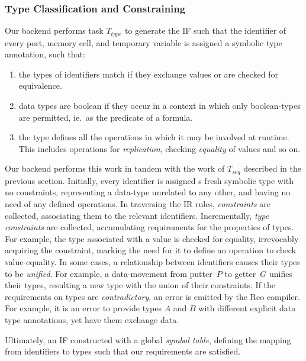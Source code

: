 \subsubsection{Type Classification and Constraining}
Our backend performs task $T_{type}$ to generate the IF such that the identifier of every port, memory cell, and temporary variable is assigned a symbolic type annotation, such that:
\begin{enumerate}
	\item the types of identifiers match if they exchange values or are checked for equivalence.
	\item data types are boolean if they occur in a context in which only boolean-types are permitted, ie.\ as the predicate of a formula.
	\item the type defines all the operations in which it may be involved at runtime. This includes operations for \textit{replication}, checking \textit{equality} of values and so on.
\end{enumerate}

Our backend performs this work in tandem with the work of $T_{seq}$ described in the previous section. Initially, every identifier is assigned s fresh symbolic type with no constraints, representing a data-type unrelated to any other, and having no need of any defined operations. In traversing the IR rules, \textit{constraints} are collected, associating them to the relevant identifiers. Incrementally, \textit{type constraints} are collected, accumulating requirements for the properties of types. For example, the type associated with a value is checked for equality, irrevocably acquiring the  constraint, marking the need for it to define an operation to check value-equality. In some cases, a relationship between identifiers causes their types to be \textit{unified}. For example, a data-movement from putter~$P$ to getter~$G$ unifies their types, resulting a new type with the union of their constraints. If the requirements on types are \textit{contradictory}, an error is emitted by the Reo compiler. For example, it is an error to provide types $A$ and $B$ with different explicit data type annotations, yet have them exchange data.

Ultimately, an IF constructed with a global \textit{symbol table}, defining the mapping from identifiers to types such that our requirements are satisfied.


